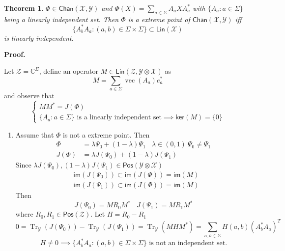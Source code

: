 \documentclass[aps,pra,onecolumn,notitlepage,superscriptaddress]{revtex4-1}
\newcommand{\C}{\mathbb{C}}
\newcommand{\spc}[1]{\mathcal{#1}}
\newcommand{\Lin}{\mathsf{Lin}}
\newcommand{\Pos}{\mathsf{Pos}}
\newcommand{\im}{\mathsf{im}}
\newcommand{\myker}{\mathsf{ker}}
\newcommand{\Tr}{\operatorname{Tr}}
\newcommand{\op}[1]{\operatorname{#1}}
\newcommand{\Chan}{{\mathsf{Chan}}}
\newtheorem{theo}{Theorem}
\def\Proof{{\bf Proof.~}}
\begin{document}
    \begin{theo}
        $\Phi \in \Chan(\spc X, \spc Y)$ and $\Phi(X) = \sum_{a \in \Sigma} A_aXA_a^*$ with $\{A_a : a \in \Sigma\}$ being a linearly independent set. Then $\Phi$ is a extreme point of $\Chan(\spc X, \spc Y)$ iff
        \begin{equation}
            \{ A_b^*A_a : (a,b) \in \Sigma \times \Sigma \} \subset \Lin(\spc X)
        \end{equation}
        is linearly independent.
    \end{theo}
    \Proof {
        Let $\spc Z = \C^{\Sigma}$, define an operator $M \in \Lin(\spc Z, \spc Y\otimes \spc X)$ as
        \begin{equation}
            M = \sum_{a \in \Sigma} \op{vec}(A_a)e_a^*
        \end{equation}
        and observe that 
        \begin{equation}
            \begin{cases}
                MM^* = J(\Phi) \\
                \text{$\{A_a : a \in \Sigma\}$ is a linearly independent set} \implies \myker(M) = \{0\}
            \end{cases}
        \end{equation}
        \begin{enumerate}
            \item Assume that $\Phi$ is not a extreme point. Then
            \begin{align}
                \Phi &= \lambda \Psi_0 + (1-\lambda) \Psi_1 \ \ \ \ \lambda \in (0,1) \ \Psi_0 \neq \Psi_1 \\
                J(\Phi) &= \lambda J(\Psi_0) + (1-\lambda) J(\Psi_1)
            \end{align}
            Since $\lambda J(\Psi_0), (1-\lambda) J(\Psi_1) \in \Pos(\spc Y \otimes \spc X)$
            \begin{align}
                &\im(J(\Psi_0)) \subset \im(J(\Phi)) = \im(M) \\
                &\im(J(\Psi_1)) \subset \im(J(\Phi)) = \im(M)
            \end{align}
            Then
            \begin{equation*}
                J(\Psi_0) = M R_0 M^* \ \ \ \ J(\Psi_1) = M R_1 M^*
            \end{equation*}
            where $R_0, R_1 \in \Pos(\spc Z)$.
            Let $H = R_0 - R_1$
            \begin{equation}
                0 = \Tr_{\spc Y}(J(\Psi_0)) - \Tr_{\spc Y}(J(\Psi_1)) = \Tr_{\spc Y}(MHM^*) = \sum_{a,b\in\Sigma} H(a,b) (A_b^*A_a)^T
            \end{equation}
            \begin{equation}
                H \neq 0 \implies \{ A_b^*A_a : (a,b) \in \Sigma \times \Sigma \} \text{ is not an independent set.}
            \end{equation}


\end{enumerate}}
\end{document}
